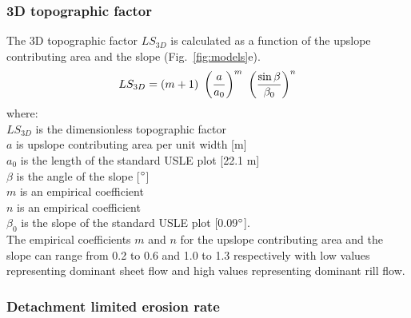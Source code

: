 \documentclass[gmd, manuscript]{copernicus}
\begin{document}

\subsubsection{3D topographic factor}
The 3D topographic factor $LS_{3D}$
is calculated as a function of the upslope contributing area
and the slope (Fig.~\ref{fig:models}e). 
\begin{equation}
\label{eq:ls_factor}
LS_{3D} = (m+1) ~ \left({a \over a_0}\right)^m ~ \left({\sin \beta \over \beta_0}\right)^n
\end{equation}
%
{\small
\noindent
where: \\
\noindent
\hspace*{0.5em} $LS_{3D}$ is the dimensionless topographic factor\\
\hspace*{0.5em} $a$ is upslope contributing area per unit width [\unit{m}]\\
\hspace*{0.5em} $a_0$ is the length of the standard USLE plot [22.1 \unit{m}]\\
\hspace*{0.5em} $\beta$ is the angle of the slope [$^{\circ}$]\\
\hspace*{0.5em} $m$ is an empirical coefficient\\
\hspace*{0.5em} $n$ is an empirical coefficient\\
\hspace*{0.5em} $\beta_0$ is the slope of the standard USLE plot [0.09$^{\circ}$].\\
}
The empirical coefficients $m$ and $n$
for the upslope contributing area and the slope
can range from 0.2 to 0.6 and 1.0 to 1.3 respectively
with low values representing dominant sheet flow
and high values representing dominant rill flow.


\subsubsection{Detachment limited erosion rate}
\end{document}
